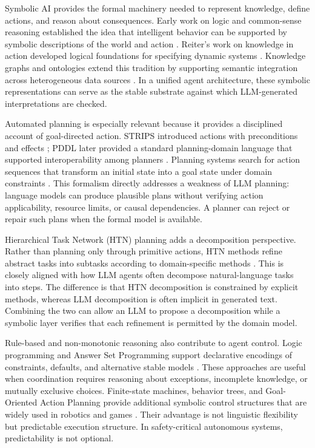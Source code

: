 Symbolic AI provides the formal machinery needed to represent knowledge, define actions, and reason about consequences. Early work on logic and common-sense reasoning established the idea that intelligent behavior can be supported by symbolic descriptions of the world and action \cite{mccarthy1969some,newell1976computer}. Reiter's work on knowledge in action developed logical foundations for specifying dynamic systems \cite{reiter2001knowledge}. Knowledge graphs and ontologies extend this tradition by supporting semantic integration across heterogeneous data sources \cite{hogan2021knowledge}. In a unified agent architecture, these symbolic representations can serve as the stable substrate against which LLM-generated interpretations are checked.

Automated planning is especially relevant because it provides a disciplined account of goal-directed action. STRIPS introduced actions with preconditions and effects \cite{fikes1971strips}; PDDL later provided a standard planning-domain language that supported interoperability among planners \cite{mcdermott1998pddl,fox2003pddl2}. Planning systems search for action sequences that transform an initial state into a goal state under domain constraints \cite{ghallab2004automated}. This formalism directly addresses a weakness of LLM planning: language models can produce plausible plans without verifying action applicability, resource limits, or causal dependencies. A planner can reject or repair such plans when the formal model is available.

Hierarchical Task Network (HTN) planning adds a decomposition perspective. Rather than planning only through primitive actions, HTN methods refine abstract tasks into subtasks according to domain-specific methods \cite{erol1994htn,nau2003shop2,georgievski2015htn}. This is closely aligned with how LLM agents often decompose natural-language tasks into steps. The difference is that HTN decomposition is constrained by explicit methods, whereas LLM decomposition is often implicit in generated text. Combining the two can allow an LLM to propose a decomposition while a symbolic layer verifies that each refinement is permitted by the domain model.

Rule-based and non-monotonic reasoning also contribute to agent control. Logic programming and Answer Set Programming support declarative encodings of constraints, defaults, and alternative stable models \cite{gelfond1991classical,lifschitz2008answer}. These approaches are useful when coordination requires reasoning about exceptions, incomplete knowledge, or mutually exclusive choices. Finite-state machines, behavior trees, and Goal-Oriented Action Planning provide additional symbolic control structures that are widely used in robotics and games \cite{colledanchise2018behavior,orkin2006three}. Their advantage is not linguistic flexibility but predictable execution structure. In safety-critical autonomous systems, predictability is not optional.

